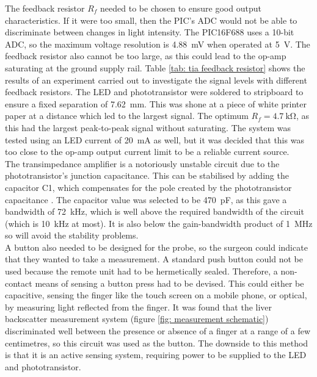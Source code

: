 The feedback resistor $R_f$ needed to be chosen to ensure good output characteristics. If it were too small, then the PIC's ADC would not be able to discriminate between changes in light intensity.  The PIC16F688 uses a 10-bit ADC, so the maximum voltage resolution is \SI{4.88}{\milli\volt} when operated at \SI{5}{\volt}. The feedback resistor also cannot be too large, as this could lead to the op-amp saturating at the ground supply rail. Table \ref{tab: tia feedback resistor} shows the results of an experiment carried out to investigate the signal levels with different feedback resistors. The LED and phototransistor were soldered to stripboard to ensure  a fixed separation of \SI{7.62}{\milli\metre}. This was shone at a piece of white printer paper at a distance which led to the largest signal. The optimum $R_f = \SI{4.7}{\kilo\ohm}$, as this had the largest peak-to-peak signal without saturating. The system was tested using an LED current of \SI{20}{\milli\ampere} as well, but it was decided that this was too close to the op-amp output current limit to be a reliable current source.\\

The transimpedance amplifier is a notoriously unstable circuit due to the phototransistor's junction capacitance. This can be stabilised by adding the capacitor C1, which compensates for the pole created by the phototransistor capacitance \cite{tia_stability}. The capacitor value was selected to be \SI{470}{\pico\farad}, as this gave a bandwidth of \SI{72}{\kilo\hertz}, which is well above the required bandwidth of the circuit (which is \SI{10}{\kilo\hertz} at most). It is also below the gain-bandwidth product of \SI{1}{\mega\hertz} so will avoid the stability problems.\\

A button also needed to be designed for the probe, so the surgeon could indicate that they wanted to take a measurement. A standard push button could not be used because the remote unit had to be hermetically sealed. Therefore, a non-contact means of sensing a button press had to be devised. This could either be capacitive, sensing the finger like the touch screen on a mobile phone, or optical, by measuring light reflected from the finger. It was found that the liver backscatter measurement system (figure \ref{fig: measurement schematic}) discriminated well between the presence or absence of a finger at a range of a few centimetres, so this circuit was used as the button. The downside to this method is that it is an active sensing system, requiring power to be supplied to the LED and phototransistor. \\

